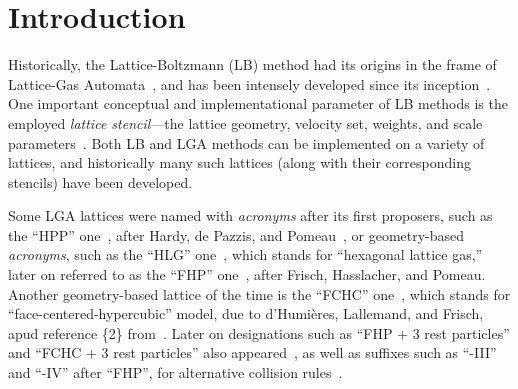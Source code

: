 \section{Introduction}

    Historically,   the   Lattice-Boltzmann   (LB)    method    had    its    origins    in    the    frame    of    Lattice-Gas
    Automata~\cite{1988-McNamaraGR+ZanettiG-PhysRevLett},     and     has     been     intensely     developed     since     its
    inception~\cite{2018-KrugerT+ViggenEM-Springer}. One important conceptual and implementational parameter of  LB  methods  is
    the    employed    \emph{lattice    stencil}---the    lattice    geometry,    velocity    set,    weights,     and     scale
    parameters~\cite{2013-HegeleJr+PhilippiPC-JSciComput,                                2013-MattilaKK+PhilippiPC-IntJModPhysC,
    2014-MattilaKK+PhilippiPC-SciWorldJ}. Both LB and LGA methods can be implemented on a variety of lattices, and  historically
    many such lattices (along with their corresponding stencils) have been developed.

    Some   LGA   lattices   were   named   with   \emph{acronyms}   after   its   first   proposers,   such   as   the   ``HPP''
    one~\cite{1986-FrischU+PomeauY-PhysRevLett},  after  Hardy,  de  Pazzis,   and   Pomeau~\cite{1973-HardyJ+PazzisO-JMathPhys,
    1976-HardyJ+PomeauY-PhysRevA,  1987-SucciS-JPhysAMathGen},  or  geometry-based  \emph{acronyms},   such   as   the   ``HLG''
    one~\cite{1986-FrischU+PomeauY-PhysRevLett}, which stands for ``hexagonal lattice gas,'' later on referred to as the ``FHP''
    one~\cite{1987-FrischU+RivetJP-ComplexSyst,  1987-SucciS-JPhysAMathGen},  after  Frisch,  Hasslacher,  and  Pomeau.  Another
    geometry-based  lattice  of  the  time  is  the  ``FCHC''  one~\cite{1987-FrischU+RivetJP-ComplexSyst},  which  stands   for
    ``face-centered-hypercubic''   model,   due   to   d'Humières,    Lallemand,    and    Frisch,    apud    reference    \{2\}
    from~\cite{1987-FrischU+RivetJP-ComplexSyst}. Later on designations such as ``FHP + 3 rest particles'' and ``FCHC +  3  rest
    particles'' also appeared~\cite{1991-BoonJP-PhysD}, as well as suffixes such as ``-III''  and  ``-IV''  after  ``FHP'',  for
    alternative collision rules~\cite{1991-AppertC+ZaleskiS-PhysD, 1991-BoonJP-PhysD}.
    

